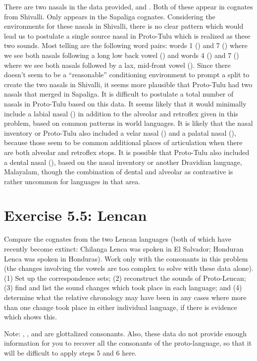 \documentclass[12pt]{article}
\begin{document}
There are two nasals in the data provided,  and . Both of these appear in cognates from Shivalli. Only  appears in the Sapaliga cognates. Considering the environments for these nasals in Shivalli, there is no clear pattern which would lead us to postulate a single source nasal in Proto-Tulu which is realized as these two sounds. Most telling are the following word pairs: words 1 () and 7 () where we see both nasals following a long low back vowel () and words 4 () and 7 () where we see both nasals followed by a lax, mid-front vowel (). Since there doesn't seem to be a ``reasonable'' conditioning environment to prompt a split to create the two nasals in Shivalli, it seems more plausible that Proto-Tulu had two nasals that merged in Sapaliga. It is difficult to postulate a total number of nasals in Proto-Tulu based on this data. It seems likely that it would minimally include a labial nasal () in addition to the alveolar and retroflex given in this problem, based on common patterns in world languages. It is likely that the nasal inventory or Proto-Tulu also included a velar nasal () and a palatal nasal (\ip{\textltailn}), because those seem to be common additional places of articulation when there are both alveolar and retroflex stops. It is possible that Proto-Tulu also included a dental nasal (), based on the nasal inventory or another Dravidian language, Malayalam, though the combination of dental and alveolar as contrastive is rather uncommon for languages in that area.

\section{Exercise 5.5: Lencan}

Compare the cognates from the two Lencan languages (both of which have recently become extinct: Chilanga Lenca was spoken in El Salvador; Honduran Lenca was spoken in Honduras). Work only with the consonants in this problem (the changes involving the vowels are too complex to solve with these data alone). (1) Set up the correspondence sets; (2) reconstruct the sounds of Proto-Lencan; (3) find and list the sound changes which took place in each language; and (4) determine what the relative chronology may have been in any cases where more than one change took place in either individual language, if there is evidence which shows this.

{\sc Note}: , , and  are glottalized consonants. Also, these data do not provide enough information for you to recover all the consonants of the proto-language, so that it will be difficult to apply steps 5 and 6 here. \\
\end{document}
